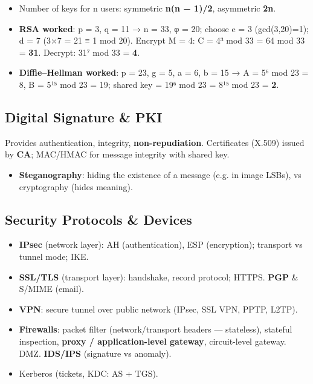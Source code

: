 \endgroup

\begin{itemize}
\tightlist
\item
  Number of keys for n users: symmetric \textbf{n(n − 1)/2}, asymmetric \textbf{2n}.
\item
  \textbf{RSA worked}: p = 3, q = 11 → n = 33, φ = 20; choose e = 3 (gcd(3,20)=1); d = 7 (3×7 = 21 ≡ 1 mod 20). Encrypt M = 4: C = 4³ mod 33 = 64 mod 33 = \textbf{31}. Decrypt: 31⁷ mod 33 = \textbf{4}.
\item
  \textbf{Diffie--Hellman worked}: p = 23, g = 5, a = 6, b = 15 → A = 5⁶ mod 23 = 8, B = 5¹⁵ mod 23 = 19; shared key = 19⁶ mod 23 = 8¹⁵ mod 23 = \textbf{2}.
\end{itemize}

\needspace{95pt}

\hypertarget{p2-09--113-digital-signature--pki}{%
\subsection{Digital Signature \& PKI}\label{p2-09--113-digital-signature--pki}}



Provides authentication, integrity, \textbf{non-repudiation}. Certificates (X.509) issued by \textbf{CA}; MAC/HMAC for message integrity with shared key.

\begin{itemize}
\tightlist
\item
  \textbf{Steganography}: hiding the existence of a message (e.g. in image LSBs), vs cryptography (hides meaning).
\end{itemize}

\needspace{95pt}

\hypertarget{p2-09--114-security-protocols--devices}{%
\subsection{Security Protocols \& Devices}\label{p2-09--114-security-protocols--devices}}

\begin{itemize}
\tightlist
\item
  \textbf{IPsec} (network layer): AH (authentication), ESP (encryption); transport vs tunnel mode; IKE.
\item
  \textbf{SSL/TLS} (transport layer): handshake, record protocol; HTTPS. \textbf{PGP} \& S/MIME (email).
\item
  \textbf{VPN}: secure tunnel over public network (IPsec, SSL VPN, PPTP, L2TP).
\item
  \textbf{Firewalls}: packet filter (network/transport headers --- stateless), stateful inspection, \textbf{proxy / application-level gateway}, circuit-level gateway. DMZ. \textbf{IDS/IPS} (signature vs anomaly).
\item
  Kerberos (tickets, KDC: AS + TGS).
\end{itemize}

